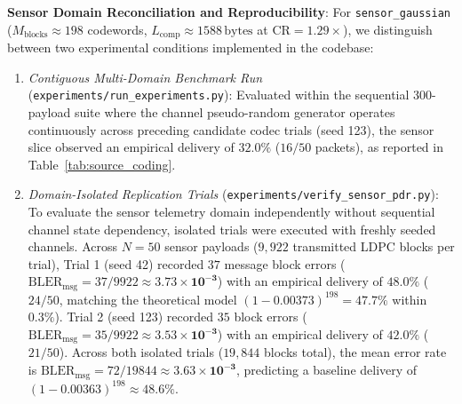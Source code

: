 \documentclass[conference]{IEEEtran}
\begin{document}
\textbf{Sensor Domain Reconciliation and Reproducibility}: For \texttt{sensor\_gaussian} ($M_{\text{blocks}} \approx 198$ codewords, $L_{\text{comp}} \approx 1588\,\text{bytes}$ at $\text{CR} = 1.29\times$), we distinguish between two experimental conditions implemented in the codebase:
\begin{enumerate}
    \item \textit{Contiguous Multi-Domain Benchmark Run} (\texttt{experiments/\allowbreak run\_\allowbreak experiments.py}): Evaluated within the sequential 300-payload suite where the channel pseudo-random generator operates continuously across preceding candidate codec trials (seed 123), the sensor slice observed an empirical delivery of $\mathbf{32.0\%}$ ($16/50$ packets), as reported in Table~\ref{tab:source_coding}.
    \item \textit{Domain-Isolated Replication Trials} (\texttt{experiments/\allowbreak verify\_\allowbreak sensor\_\allowbreak pdr.py}): To evaluate the sensor telemetry domain independently without sequential channel state dependency, isolated trials were executed with freshly seeded channels. Across $N=50$ sensor payloads ($9{,}922$ transmitted LDPC blocks per trial), Trial 1 (seed 42) recorded $37$ message block errors ($\text{BLER}_{\text{msg}} = 37/9922 \approx \mathbf{3.73 \times 10^{-3}}$) with an empirical delivery of $\mathbf{48.0\%}$ ($24/50$, matching the theoretical model $(1 - 0.00373)^{198} = 47.7\%$ within $0.3\%$). Trial 2 (seed 123) recorded $35$ block errors ($\text{BLER}_{\text{msg}} = 35/9922 \approx \mathbf{3.53 \times 10^{-3}}$) with an empirical delivery of $\mathbf{42.0\%}$ ($21/50$). Across both isolated trials ($19{,}844$ blocks total), the mean error rate is $\text{BLER}_{\text{msg}} = 72/19844 \approx \mathbf{3.63 \times 10^{-3}}$, predicting a baseline delivery of $(1 - 0.00363)^{198} \approx \mathbf{48.6\%}$.
\end{enumerate}
\end{document}
